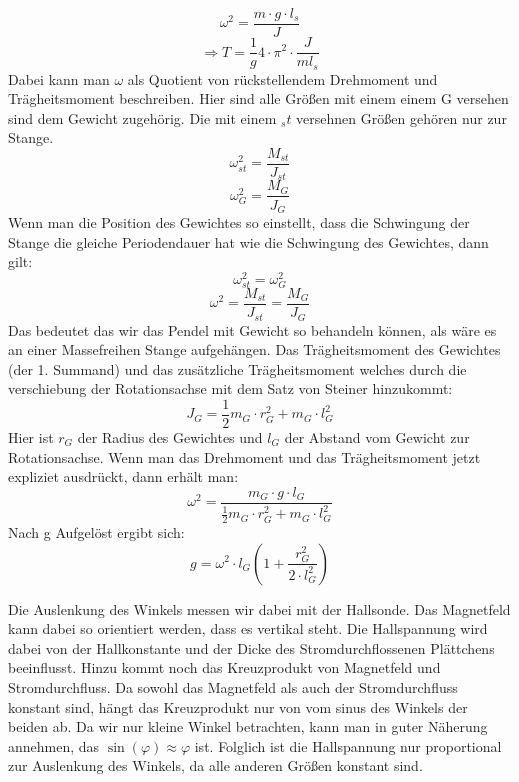 \documentclass[twoside]{protokoll}
\begin{document}
\begin{equation}
    \omega^2 = \frac{m \cdot g \cdot l_s}{J}
\end{equation}
\begin{equation}
    \Rightarrow T = \frac{1}{g} 4 \cdot \pi^2 \cdot \frac{J}{m l_s}
\end{equation}
Dabei kann man $\omega$ als Quotient von rückstellendem Drehmoment und Trägheitsmoment beschreiben.
Hier sind alle Größen mit einem einem G versehen sind dem Gewicht zugehörig. Die mit einem $_st$ versehnen Größen gehören nur zur Stange.
\begin{equation}
    \omega_{st}^2 = \frac{M_{st}}{J_{st}}
\end{equation}
\begin{equation}
    \omega_{G}^2 = \frac{M_G}{J_G}
\end{equation}
Wenn man die Position des Gewichtes so einstellt, dass die Schwingung der Stange die gleiche Periodendauer hat wie die Schwingung des Gewichtes, dann gilt:
\begin{equation}
    \omega_{st}^2 = \omega_{G}^2
\end{equation}
\begin{equation}
    \omega^2 = \frac{M_{st}}{J_{st}} = \frac{M_G}{J_G}
\end{equation}
Das bedeutet das wir das Pendel mit Gewicht so behandeln können, als wäre es an einer Massefreihen Stange aufgehängen.
Das Trägheitsmoment des Gewichtes (der 1. Summand) und das zusätzliche Trägheitsmoment welches durch die verschiebung der Rotationsachse mit dem Satz von Steiner hinzukommt:
\begin{equation}
    J_G = \frac{1}{2} m_G \cdot r_G^2 + m_G \cdot l_G^2
\end{equation}
Hier ist $r_G$ der Radius des Gewichtes und $l_G$ der Abstand vom Gewicht zur Rotationsachse.
Wenn man das Drehmoment und das Trägheitsmoment jetzt expliziet ausdrückt, dann erhält man:
\begin{equation}
    \omega^2 = \frac{m_G \cdot g \cdot l_G}{\frac{1}{2} m_G \cdot r_G^2 + m_G \cdot l_G^2}
\end{equation}
Nach g Aufgelöst ergibt sich:
\begin{equation}
    g = \omega^2 \cdot l_G \left( 1 + \frac{r_G^2}{2 \cdot l_G^2} \right)
    \label{eq:pendel_g}
\end{equation}


Die Auslenkung des Winkels messen wir dabei mit der Hallsonde.
Das Magnetfeld kann dabei so orientiert werden, dass es vertikal steht.
Die Hallspannung wird dabei von der Hallkonstante und  der Dicke des Stromdurchflossenen Plättchens beeinflusst.
Hinzu kommt noch das Kreuzprodukt von Magnetfeld und Stromdurchfluss. Da sowohl das Magnetfeld als auch der Stromdurchfluss konstant sind, hängt das Kreuzprodukt nur von vom sinus des Winkels der beiden ab.
Da wir nur kleine Winkel betrachten, kann man in guter Näherung annehmen, das $\sin(\varphi) \approx \varphi$ ist.
Folglich ist die Hallspannung nur proportional zur Auslenkung des Winkels, da alle anderen Größen konstant sind.
\end{document}
